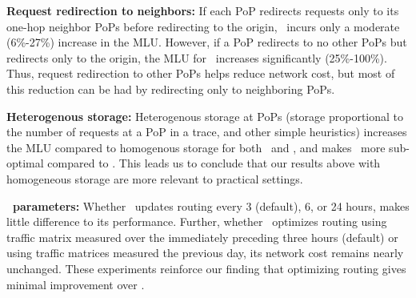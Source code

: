 \textbf{Request redirection to neighbors:}  If each PoP redirects requests only to its one-hop neighbor PoPs before redirecting to the origin, \invlru\ incurs only a moderate (6\%-27\%) increase in the MLU. However, if a PoP redirects to no other PoPs but redirects only to the origin, the MLU  for \invlru\ increases significantly (25\%-100\%). Thus, request redirection to other PoPs helps reduce network cost, but most of this reduction can be had by redirecting only to neighboring PoPs.


\textbf{Heterogenous storage:} Heterogenous storage at PoPs  (storage proportional to the number of requests at a PoP in a trace, and other simple heuristics) increases the MLU compared to homogenous storage for both \invlru\ and \optrpfuture, and makes \invlru\ more sub-optimal compared to \optrpfuture. This leads us to conclude that our results above with homogeneous storage are more relevant to practical settings.

%


\textbf{\optlru\ parameters:} Whether \optlru\ updates routing every 3 (default), 6, or 24 hours,  makes little difference to its performance. Further, whether \optlru\  optimizes routing using traffic matrix measured over the immediately preceding three hours (default) or using traffic matrices measured the previous day, its network cost remains nearly unchanged. These experiments reinforce our finding that optimizing routing gives minimal improvement over \invlru.

